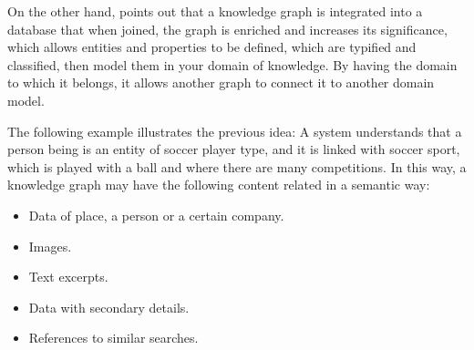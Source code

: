 On the other hand, \cite{Saorin} points out that a knowledge graph is integrated
into a database that when joined, the graph is enriched and increases its 
significance, which allows entities and properties to be defined, which are 
typified and classified, then model them in your domain of knowledge. By having 
the domain to which it belongs, it allows another graph to connect it to another 
domain model.

The following example illustrates the previous idea: A system understands that 
a person being is an entity of soccer player type, and it is linked with soccer 
sport, which is played with a ball and where there are many competitions. 
In this way, a knowledge graph may have the following content related in a 
semantic way:

\begin{itemize}
\item Data of place, a person or a certain company.
\item Images.
\item Text excerpts.
\item Data with secondary details.
\item References to similar searches.
\end{itemize}

